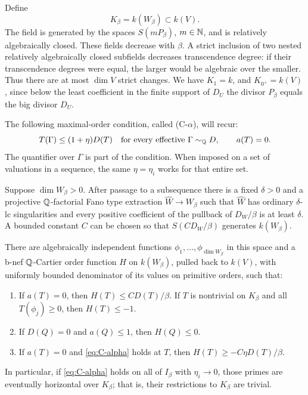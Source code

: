 Define
\[
                      K_\beta=k(W_\beta)\subset k(V).
\]
The field is generated by the spaces $S(mP_\beta)$, $m\in\mathbb N$, and is
relatively algebraically closed.  These fields decrease with $\beta$.
A strict inclusion of two nested relatively algebraically closed
subfields decreases transcendence degree: if their transcendence
degrees were equal, the larger would be algebraic over the smaller.
Thus there are at most $\dim V$ strict changes.  We have $K_1=k$, and
$K_{0^+}=k(V)$, since below the least coefficient in the finite support
of $D_U$ the divisor $P_\beta$ equals the big divisor $D_U$.

The following maximal-order condition, called \textup{(C-$\alpha$)}, will recur:
\begin{equation}\label{eq:C-alpha}
 T(\Gamma)\leq(1+\eta)D(T)
 \quad\text{for every effective }\Gamma\sim_\mathbb Q D,
 \qquad a(T)=0.
\end{equation}
The quantifier over $\Gamma$ is part of the condition.  When imposed on
a set of valuations in a sequence, the same $\eta=\eta_i$ works for
that entire set.

\begin{lemma}
\label{lem:C-cutoff-claims}
Suppose $\dim W_\beta>0$.  After passage to a subsequence there is a
fixed $\delta>0$ and a projective $\mathbb Q$-factorial Fano type extraction
$\widehat W\to W_\beta$ such that $\widehat W$ has ordinary
$\delta$-lc singularities and every positive coefficient of the pullback
of $D_W/\beta$ is at least $\delta$.  A bounded constant $C$ can be
chosen so that $S(CD_W/\beta)$ generates $k(W_\beta)$.

There are algebraically independent functions
$\phi_1,\ldots,\phi_{\dim W_\beta}$ in this space and a b-nef
$\mathbb Q$-Cartier order function $H$ on $k(W_\beta)$, pulled back to
$k(V)$, with uniformly bounded denominator of its values on primitive
orders, such that:
\begin{enumerate}[label=\textup{(\roman*)}]
\item If $a(T)=0$, then $H(T)\leq CD(T)/\beta$.  If $T$ is nontrivial
on $K_\beta$ and all $T(\phi_j)\geq0$, then $H(T)\leq-1$.
\item If $D(Q)=0$ and $a(Q)\leq1$, then $H(Q)\leq0$.
\item If $a(T)=0$ and \eqref{eq:C-alpha} holds at $T$, then
$H(T)\geq-C\eta D(T)/\beta$.
\end{enumerate}
In particular, if \eqref{eq:C-alpha} holds on all of $I_\beta$ with
$\eta_i\to0$, those primes are eventually horizontal over $K_\beta$;
that is, their restrictions to $K_\beta$ are trivial.
\end{lemma}

